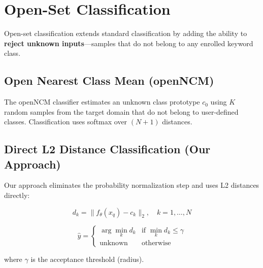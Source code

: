 \documentclass[12pt,a4paper]{report}
\begin{document}
\section{Open-Set Classification}
\label{sec:openset}

Open-set classification extends standard classification by adding the ability
to \textbf{reject unknown inputs}---samples that do not belong to any enrolled
keyword class.

\subsection{Open Nearest Class Mean (openNCM)}

The openNCM classifier \cite{rusci2023} estimates an unknown class prototype
$c_0$ using $K$ random samples from the target domain that do not belong to
user-defined classes. Classification uses softmax over $(N+1)$ distances.

\subsection{Direct L2 Distance Classification (Our Approach)}

Our approach eliminates the probability normalization step and uses L2
distances directly:

\begin{equation}
    d_k = \|f_\theta(x_q) - c_k\|_2, \quad k = 1, \ldots, N
    \label{eq:l2dist}
\end{equation}

\begin{equation}
    \hat{y} = \begin{cases}
        \displaystyle\arg\min_k d_k & \text{if } \min_k d_k \leq \gamma \\
        \text{unknown} & \text{otherwise}
    \end{cases}
    \label{eq:direct_classify}
\end{equation}

where $\gamma$ is the acceptance threshold (radius).
\end{document}

